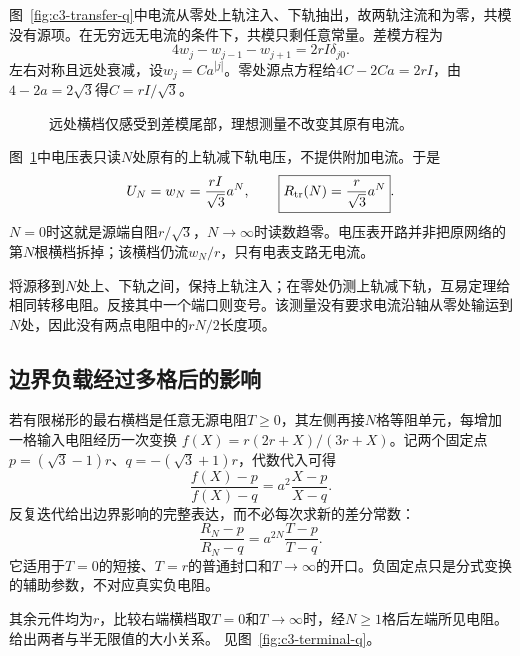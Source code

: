 \begin{solution}
图~\ref{fig:c3-transfer-q}中电流从零处上轨注入、下轨抽出，故两轨注流和为零，共模没有源项。在无穷远无电流的条件下，共模只剩任意常量。差模方程为
\[
 4w_j-w_{j-1}-w_{j+1}=2rI\delta_{j0}.
\]
左右对称且远处衰减，设$w_j=C a^{|j|}$。零处源点方程给$4C-2Ca=2rI$，由$4-2a=2\sqrt3$得$C=rI/\sqrt3$。
\begin{figure}[H]\centering
{}
\caption{远处横档仅感受到差模尾部，理想测量不改变其原有电流。}\label{fig:c3-transfer-s}
\end{figure}
图~\ref{fig:c3-transfer-s}中电压表只读$N$处原有的上轨减下轨电压，不提供附加电流。于是
\[
 U_N=w_N=\frac{rI}{\sqrt3}a^N,
 \qquad\boxed{R_{\rm tr}(N)=\frac r{\sqrt3}a^N}.
\]
$N=0$时这就是源端自阻$r/\sqrt3$，$N\to\infty$时读数趋零。电压表开路并非把原网络的第$N$根横档拆掉；该横档仍流$w_N/r$，只有电表支路无电流。

将源移到$N$处上、下轨之间，保持上轨注入；在零处仍测上轨减下轨，互易定理给相同转移电阻。反接其中一个端口则变号。该测量没有要求电流沿轴从零处输运到$N$处，因此没有两点电阻中的$rN/2$长度项。
\end{solution}
\subsection{边界负载经过多格后的影响}
若有限梯形的最右横档是任意无源电阻$T\ge0$，其左侧再接$N$格等阻单元，每增加一格输入电阻经历一次变换
$f(X)=r(2r+X)/(3r+X)$。记两个固定点$p=(\sqrt3-1)r$、$q=-(\sqrt3+1)r$，代数代入可得
\[
 \frac{f(X)-p}{f(X)-q}=a^2\frac{X-p}{X-q}.
\]
反复迭代给出边界影响的完整表达，而不必每次求新的差分常数：
\[
 \frac{R_N-p}{R_N-q}=a^{2N}\frac{T-p}{T-q}.
\]
它适用于$T=0$的短接、$T=r$的普通封口和$T\to\infty$的开口。负固定点只是分式变换的辅助参数，不对应真实负电阻。

\begin{example}[有限梯形在右端短接与开路]\label{ex:c3-terminal}
其余元件均为$r$，比较右端横档取$T=0$和$T\to\infty$时，经$N\ge1$格后左端所见电阻。给出两者与半无限值的大小关系。 见图~\ref{fig:c3-terminal-q}。
\end{example}

